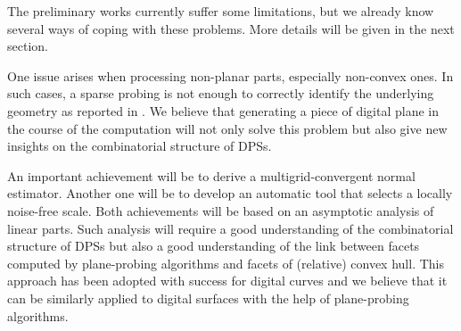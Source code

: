The preliminary works \cite{LPRTCS2016, LPRDGCI2016, LPRJMIV2017}
currently suffer some limitations, but we already know several ways of coping with
these problems. More details will be given in the next section.

One issue arises when processing non-planar parts, especially non-convex ones.
In such cases, a sparse probing is not enough to correctly identify the underlying geometry
as reported in \cite{LPRJMIV2017}.
We believe that generating a piece of digital plane in the course of the computation will
not only solve this problem but also give new insights on the combinatorial structure
of DPSs.

An important achievement will be to derive a multigrid-convergent normal estimator.
Another one will be to develop an automatic tool that selects a locally noise-free scale.
Both achievements will be based on an asymptotic analysis of linear parts. Such analysis
will require a good understanding of the combinatorial structure of DPSs but also a
good understanding of the link between facets computed by plane-probing algorithms and
facets of (relative) convex hull. This approach has been adopted with success for digital
curves \cite{Lachaud2012} and we believe that it can be similarly applied to digital
surfaces with the help of plane-probing algorithms.
 
